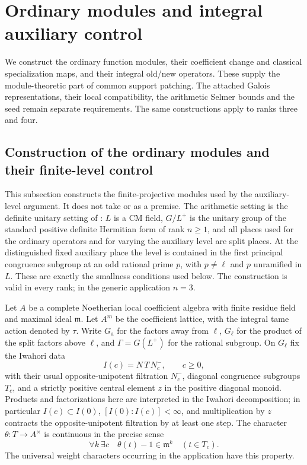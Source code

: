 \section{Ordinary modules and integral auxiliary control}
\label{sec:sr-ordinary-control}
We construct the ordinary function modules, their coefficient change and
classical specialization maps, and their integral old/new operators.
These supply the module-theoretic part of common support patching.
The attached Galois representations, their local compatibility, the
arithmetic Selmer bounds and the seed remain separate requirements.
The same constructions apply to ranks three and four.


\subsection{Construction of the ordinary modules and their finite-level control}
\label{sec:ordinary-module-construction}

This subsection constructs the finite-projective modules used by the
auxiliary-level argument.  It does not take  or
 as a premise.  The arithmetic setting is the definite
unitary setting of : \(L\) is a CM field,
\(G/L^+\) is the unitary group of the standard positive definite
Hermitian form of rank \(n\geq1\), and all places used for the ordinary
operators and for varying the auxiliary level are split places.
At the distinguished fixed auxiliary place the level is contained in
the first principal congruence subgroup at an odd rational prime \(p\),
with \(p\ne\ell\) and \(p\) unramified in \(L\).  These are exactly the
smallness conditions used below.  The construction is valid in every
rank; in the generic application \(n=3\).

Let \(A\) be a complete Noetherian local coefficient algebra with finite
residue field and maximal ideal \(\mathfrak m\).  Let \(A^m\) be the
coefficient lattice, with the integral tame action denoted by \(\tau\).
Write \(G_{\mathrm a}\) for the factors away from \(\ell\), \(G_\ell\)
for the product of the split factors above \(\ell\), and
\(\Gamma=G(L^+)\) for the rational subgroup.  On \(G_\ell\) fix the
Iwahori data
\[
 I(c)=N\,T\,N^-_c,\qquad c\geq0,
\]
with their usual opposite-unipotent filtration \(N^-_c\), diagonal
congruence subgroups \(T_c\), and a strictly positive central element
\(z\) in the positive diagonal monoid.  Products and factorizations here
are interpreted in the Iwahori decomposition; in particular
\(I(c)\subset I(0)\), \([I(0):I(c)]<\infty\), and multiplication by \(z\)
contracts the opposite-unipotent filtration by at least one step.
The character \(\theta:T\to A^\times\) is continuous in the precise
sense
\[
 \forall k\ \exists c\quad
 \theta(t)-1\in\mathfrak m^k\quad(t\in T_c).
 \tag{OC1}
\]
The universal weight characters occurring in the application have this
property.

